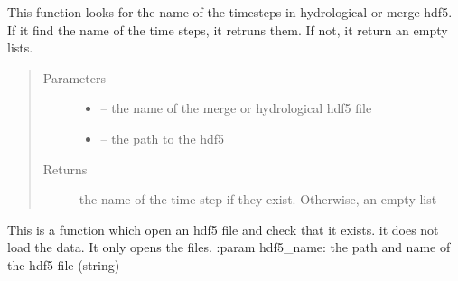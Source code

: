 \documentclass[letterpaper,10pt,english]{sphinxmanual}
\begin{document}

\begin{fulllineitems}
\label{\detokenize{index:src.load_hdf5.load_timestep_name}}
This function looks for the name of the timesteps in hydrological or merge hdf5. If it find the name
of the time steps, it retruns them. If not, it return an empty lists.
\begin{quote}\begin{description}
\item[{Parameters}] \leavevmode\begin{itemize}
\item {} 
 -- the name of the merge or hydrological hdf5 file

\item {} 
 -- the path to the hdf5

\end{itemize}

\item[{Returns}] \leavevmode
the name of the time step if they exist. Otherwise, an empty list

\end{description}\end{quote}

\end{fulllineitems}


\begin{fulllineitems}
\label{\detokenize{index:src.load_hdf5.open_hdf5}}
This is a function which open an hdf5 file and check that it exists. it does not load the data. It only opens the
files.
:param hdf5\_name: the path and name of the hdf5 file (string)

\end{fulllineitems}

\end{document}

